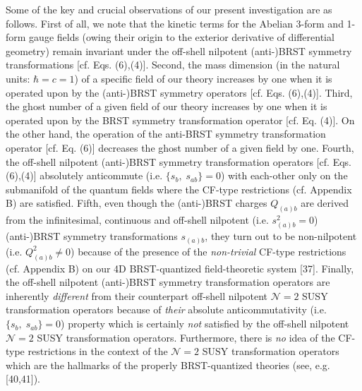 \documentclass[12pt]{article}
\begin{document}
Some of the key and crucial observations of our present investigation are as follows. First of all, we note that the kinetic terms for the 
Abelian 3-form and 1-form gauge fields (owing their origin to the exterior derivative of differential geometry) remain invariant under the
off-shell nilpotent (anti-)BRST symmetry transformations [cf. Eqs. (6),(4)]. Second, the mass dimension
(in the natural units: $\hbar =  c = 1 $) of a specific  field of our theory increases by one when it is operated upon by the (anti-)BRST symmetry operators
[cf. Eqs. (6),(4)]. Third, the ghost number of a given field of our theory increases by one when it is operated upon by the 
BRST symmetry transformation operator [cf. Eq. (4)]. On the other hand, the operation of the anti-BRST symmetry transformation
operator [cf. Eq. (6)] decreases the ghost number of a given field by one. Fourth, the off-shell nilpotent (anti-)BRST symmetry
transformation operators  [cf. Eqs. (6),(4)] absolutely anticommute  (i.e. $\{ s_b, \; s_{ab} \} = 0$) with each-other only on the submanifold of the 
quantum fields where the CF-type restrictions (cf. Appendix B) are satisfied. Fifth, even though the (anti-)BRST charges $Q_{(a)b}$  are
derived from the infinitesimal, continuous and off-shell nilpotent (i.e. $s_{(a)b}^2 = 0 $) (anti-)BRST symmetry transformations $s_{(a)b}$,
they turn out to be non-nilpotent (i.e.  $Q_{(a)b}^2 \neq 0 $) because of the presence of the {\it non-trivial} CF-type restrictions (cf. Appendix B)
on our 4D BRST-quantized field-theoretic system [37]. Finally, the off-shell nilpotent (anti-)BRST symmetry transformation operators are 
inherently {\it different}
from their counterpart off-shell nilpotent $\mathcal {N} = 2 $ SUSY 
transformation operators because of {\it their} absolute anticommutativity (i.e.  $\{ s_b, \; s_{ab} \} = 0$)
property which  is certainly {\it not} satisfied by the off-shell nilpotent $\mathcal {N} = 2 $ SUSY transformation operators. Furthermore, there 
is {\it no} idea of the CF-type restrictions in the context of the $\mathcal {N} = 2 $ SUSY transformation operators which are the hallmarks
of the properly BRST-quantized theories (see, e.g. [40,41]).
\end{document}
